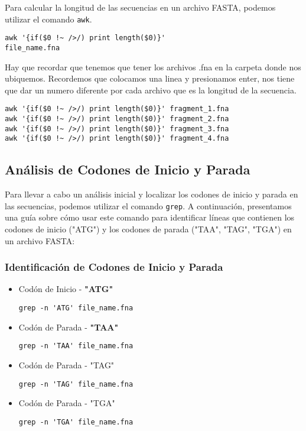 Para calcular la longitud de las secuencias en un archivo FASTA, podemos utilizar el comando \texttt{awk}. 

\begin{verbatim}
awk '{if($0 !~ />/) print length($0)}' 
file_name.fna
\end{verbatim}

Hay que recordar que tenemos que tener los archivos .fna en la carpeta donde nos ubiquemos. Recordemos que colocamos una linea y presionamos enter, nos tiene que dar un numero diferente por cada archivo que es la longitud de la secuencia.
\begin{verbatim}
awk '{if($0 !~ />/) print length($0)}' fragment_1.fna
awk '{if($0 !~ />/) print length($0)}' fragment_2.fna
awk '{if($0 !~ />/) print length($0)}' fragment_3.fna
awk '{if($0 !~ />/) print length($0)}' fragment_4.fna
\end{verbatim}

\subsection*{Análisis de Codones de Inicio y Parada}

Para llevar a cabo un análisis inicial y localizar los codones de inicio y parada en las secuencias, podemos utilizar el comando \texttt{grep}. A continuación, presentamos una guía sobre cómo usar este comando para identificar líneas que contienen los codones de inicio ("ATG") y los codones de parada ("TAA", "TAG", "TGA") en un archivo FASTA:

\subsubsection*{Identificación de Codones de Inicio y Parada}

\begin{itemize}
\item Codón de Inicio - \textbf{"ATG"}  
\begin{verbatim}
grep -n 'ATG' file_name.fna
\end{verbatim}

\item Codón de Parada - \textbf{"TAA"}  
\begin{verbatim}
grep -n 'TAA' file_name.fna
\end{verbatim}

\item Codón de Parada - "TAG"  
\begin{verbatim}
grep -n 'TAG' file_name.fna
\end{verbatim}

\item Codón de Parada - "TGA"  
\begin{verbatim}
grep -n 'TGA' file_name.fna
\end{verbatim}
\end{itemize}

